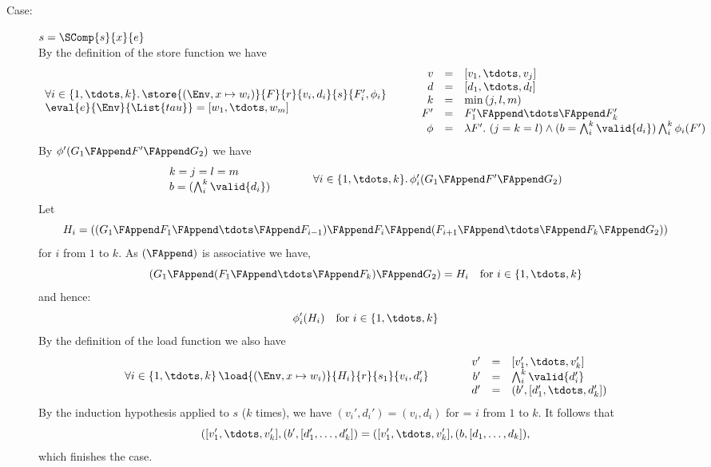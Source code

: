 {\begin{description}
\item[Case:] $s = \SComp{s}{x}{e}$\\[1ex]
By the definition of the store function we have
\[
\begin{array}{l}
\forall i \in \{1,\tdots,k\}.\,\store{(\Env, x \mapsto w_i)}{F}{r}{v_i,d_i}{s}{F_i',\phi_i}\\
\eval{e}{\Env}{\List{tau}} = [w_1,\tdots,w_m ]\\
\end{array}\hspace*{.75cm}\begin{array}{rcl}
v &=& [v_1,\tdots,v_j]\\
d &=& [d_1,\tdots,d_l]\\
k &=& \min{(j,l,m)}\\
F' &=& F_1' \FAppend \tdots \FAppend F_k'\\
\phi &=& \lambda F'.~(j = k = l) \wedge (b = \bigwedge_i^k \valid{d_i}) \bigwedge_i^k \phi_i(F')\\
\end{array}
\]
By $\phi'(G_1 \FAppend F' \FAppend G_2)$ we have
\[
\begin{array}{l}
k = j = l = m\\
b = (\bigwedge_i^k \valid{d_i})\\
\end{array}\hspace*{1cm}\begin{array}{l}
\forall i \in \{1,\tdots,k\}.\,\phi_i'(G_1 \FAppend F' \FAppend G_2) \\
\end{array}
\]
%
Let
\[
H_i = ((G_1\FAppend F_1\FAppend \tdots \FAppend F_{i-1}) \FAppend F_i \FAppend (F_{i+1} \FAppend \tdots \FAppend F_k \FAppend G_2))
\]
for $i$ from $1$ to $k$. As $(\FAppend)$ is associative we have,
\[
(G_1\FAppend (F_1\FAppend \tdots \FAppend F_k)\FAppend G_2) = H_i \quad \text{for}~i \in \{1,\tdots,k\}
\]
and hence:
\[
\phi_i'(H_i) \quad \text{for}~i \in \{1,\tdots,k\}
\]
%
By the definition of the load function we also have 
\[ 
\begin{array}{l}
\forall i \in \{1,\tdots,k\}\,\load{(\Env, x \mapsto w_i)}{H_i}{r}{s_1}{v_i,d_i'}\\
\end{array}\hspace*{1cm}\begin{array}{rcl}
v' &=& [v_1',\tdots,v_k']\\
b' &=& \bigwedge_i^k \valid{d_i'}\\
d' &=& (b',[d_1',\tdots,d_k'])\\
\end{array}
\]
%
By the induction hypothesis applied to $s$ ($k$ times), we have
$(v_i',d_i') = (v_i,d_i)$ for = $i$ from $1$ to $k$. It follows that
%
\[
([v_1',\tdots,v_k'],(b',[d_1',\dots,d_k']) = 
([v_1',\tdots,v_k'],(b,[d_1,\dots,d_k]),
\]
%
which finishes the case.


\end{description}}
